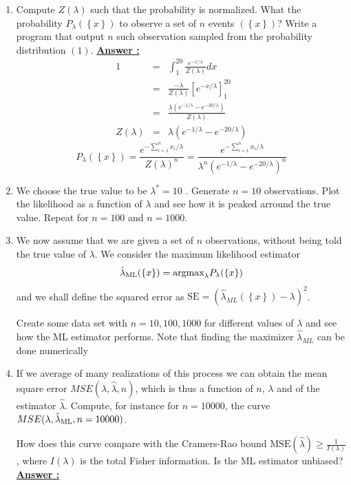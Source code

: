 \documentclass[11pt]{article}
\begin{document}
\begin{enumerate}
\item Compute $Z(\lambda)$ such that the probability is normalized. What the probability $P_{\lambda}(\left\{x\right\})$ to observe a set of $n$ events $(\left\{x\right\})$? Write a program that output $n$ such observation sampled from the probability distribution $(1)$.
\newline
\textbf{\underline{Answer :}}
\begin{eqnarray*}
	1 &= &\int_1^{20} \frac{e^{-x/\lambda}}{Z(\lambda)} dx\\
    &= &\frac{-\lambda}{Z(\lambda)} \left[ e^{-x/\lambda} \right]^{20}_1 \\
    &= &\frac{\lambda ( e^{-1/\lambda} - e^{-20/\lambda}) }{Z(\lambda)} \\
    Z(\lambda) &= &\lambda ( e^{-1/\lambda} - e^{-20/\lambda})
\end{eqnarray*}
\begin{equation*}
	P_\lambda (\left\{x\right\}) = \frac{e^{- \sum_{i=1}^n x_i/\lambda}}{Z(\lambda)^n} = \frac{e^{- \sum_{i=1}^n x_i/\lambda}}{\lambda^n ( e^{-1/\lambda} - e^{-20/\lambda})^n}
\end{equation*}



\item We choose the true value to be $\lambda^*=10$ . Generate $n=10$ observations. Plot the likelihood as a function of $\lambda$ and see how it is peaked arround the true value. Repeat for $n=100$ and $n=1000$.

\item We now assume that we are given a set of $n$ observations, without being told the true value of $\lambda$.  We consider the maximum likelihood estimator
\begin{eqnarray}
\hat \lambda_{\rm ML}(\left\{x\right\}) = \text{\rm argmax}_{\lambda} P_{\lambda}(\left\{x\right\})
\end{eqnarray}
and we shall define the squared error as  $\text{SE}=(\hat \lambda_{ML} (\left\{x\right\}) - \lambda)^2$. 

Create some data set with $n=10,100,1000$ for different values of $\lambda$ and see how the ML estimator performs. Note that finding the maximizer $\hat \lambda_{ML}$ can be done numerically 

\item If we average of many realizations of this process we can obtain the mean square error $MSE(\lambda,\hat \lambda,n)$, which is thus a function of $n$, $\lambda$ and of the estimator $\hat \lambda$. Compute, for instance for $n=10000$, the curve $MSE(\lambda,\hat \lambda_{\rm ML},n=10000)$. 

How does this curve compare with the Cramers-Rao bound ${\mathrm  {MSE}}({\hat  {\lambda }})\geq {\frac  {1}{I(\lambda )}}$, where $I(\lambda )$ is the total Fisher information. Is the ML estimator unbiased?
\newline
\textbf{\underline{Answer :}}

\end{enumerate}

%
\end{document}
